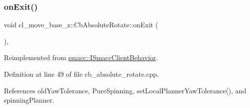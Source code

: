 \mbox{\label{classcl__move__base__z_1_1CbAbsoluteRotate_a0e362b8e9f0d7de5aeee183ba4031437}} 
\subsubsection{\texorpdfstring{on\+Exit()}{onExit()}}
{\footnotesize\ttfamily void cl\+\_\+move\+\_\+base\+\_\+z\+::\+Cb\+Absolute\+Rotate\+::on\+Exit (\begin{DoxyParamCaption}{ }\end{DoxyParamCaption})\hspace{0.3cm}{\ttfamily [override]}, {\ttfamily [virtual]}}



Reimplemented from \hyperlink{classsmacc_1_1ISmaccClientBehavior_a36bf771905e3bf750909a15e4215a9b3}{smacc\+::\+I\+Smacc\+Client\+Behavior}.



Definition at line 49 of file cb\+\_\+absolute\+\_\+rotate.\+cpp.



References old\+Yaw\+Tolerance, Pure\+Spinning, set\+Local\+Planner\+Yaw\+Tolerance(), and spinning\+Planner.


